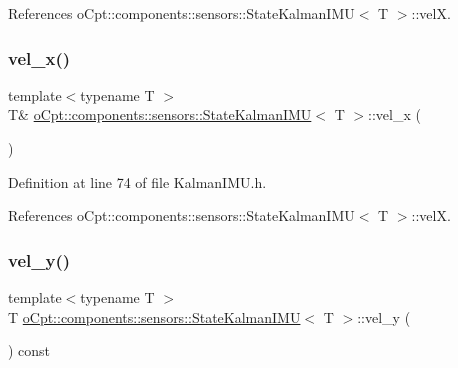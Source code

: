 References o\+Cpt\+::components\+::sensors\+::\+State\+Kalman\+I\+M\+U$<$ T $>$\+::velX.

\hypertarget{classo_cpt_1_1components_1_1sensors_1_1_state_kalman_i_m_u_a63461190b792058a6bf1575712977020}{}\label{classo_cpt_1_1components_1_1sensors_1_1_state_kalman_i_m_u_a63461190b792058a6bf1575712977020} 
\subsubsection{\texorpdfstring{vel\+\_\+x()}{vel\_x()}\hspace{0.1cm}{\footnotesize\ttfamily [2/2]}}
{\footnotesize\ttfamily template$<$typename T $>$ \\
T\& \hyperlink{classo_cpt_1_1components_1_1sensors_1_1_state_kalman_i_m_u}{o\+Cpt\+::components\+::sensors\+::\+State\+Kalman\+I\+MU}$<$ T $>$\+::vel\+\_\+x (\begin{DoxyParamCaption}{ }\end{DoxyParamCaption})\hspace{0.3cm}{\ttfamily [inline]}}



Definition at line 74 of file Kalman\+I\+M\+U.\+h.



References o\+Cpt\+::components\+::sensors\+::\+State\+Kalman\+I\+M\+U$<$ T $>$\+::velX.

\hypertarget{classo_cpt_1_1components_1_1sensors_1_1_state_kalman_i_m_u_a50172396bd207a909ca324abd5b5d22d}{}\label{classo_cpt_1_1components_1_1sensors_1_1_state_kalman_i_m_u_a50172396bd207a909ca324abd5b5d22d} 
\subsubsection{\texorpdfstring{vel\+\_\+y()}{vel\_y()}\hspace{0.1cm}{\footnotesize\ttfamily [1/2]}}
{\footnotesize\ttfamily template$<$typename T $>$ \\
T \hyperlink{classo_cpt_1_1components_1_1sensors_1_1_state_kalman_i_m_u}{o\+Cpt\+::components\+::sensors\+::\+State\+Kalman\+I\+MU}$<$ T $>$\+::vel\+\_\+y (\begin{DoxyParamCaption}{ }\end{DoxyParamCaption}) const\hspace{0.3cm}{\ttfamily [inline]}}




